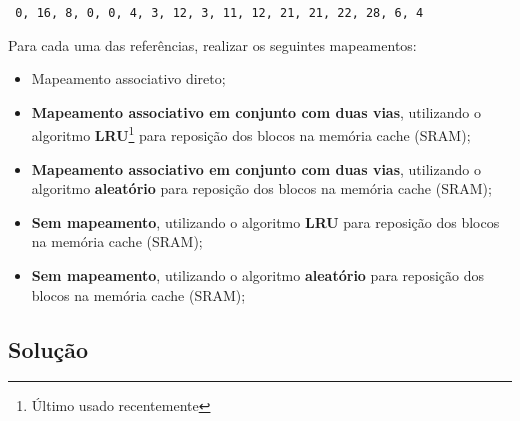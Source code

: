 \begin{center}
  \tt
  0, 16, 8, 0, 0, 4, 3, 12, 3, 11, 12, 21, 21, 22, 28, 6, 4 \\
\end{center}

Para cada uma das referências, realizar os seguintes mapeamentos:

\begin{itemize}
\item Mapeamento associativo direto;
\item {\bf Mapeamento associativo em conjunto com duas vias}, utilizando o
  algoritmo {\bf LRU}\footnote{Último usado recentemente} para
  reposição dos blocos na memória cache (SRAM);
\item {\bf Mapeamento associativo em conjunto com duas
  vias}, utilizando o algoritmo {\bf aleatório }
  para reposição dos blocos na memória cache (SRAM);
\item {\bf Sem mapeamento}, utilizando o algoritmo {\bf LRU} para
  reposição dos blocos na memória cache (SRAM);
\item {\bf Sem mapeamento}, utilizando o algoritmo {\bf aleatório } para
  reposição dos blocos na memória cache (SRAM);
\end{itemize}


\setcounter{dramaddr}{0}

\subsection*{Solução}

